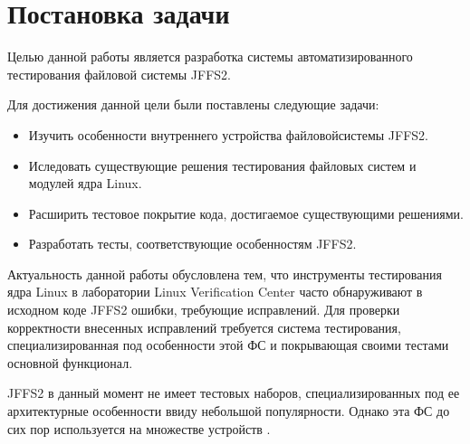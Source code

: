 \section{Постановка задачи}
\label{sec:Chapter1} 

Целью данной работы является разработка системы автоматизированного тестирования файловой системы JFFS2.

Для достижения данной цели были поставлены следующие задачи:

\begin{itemize}
	\item Изучить особенности внутреннего устройства файловойсистемы JFFS2.
	\item Иследовать существующие решения тестирования файловых систем и модулей ядра Linux.
	\item Расширить тестовое покрытие кода, достигаемое существующими решениями.
	\item Разработать тесты, соответствующие особенностям JFFS2.
\end{itemize}

Актуальность данной работы обусловлена тем, что инструменты тестирования ядра Linux в лаборатории Linux Verification Center \cite{lvc} часто обнаруживают в исходном коде JFFS2 ошибки, требующие исправлений. Для проверки корректности внесенных исправлений требуется система тестирования, специализированная под особенности этой ФС и покрывающая своими тестами основной функционал.

JFFS2 в данный момент не имеет тестовых наборов, специализированных под ее архитектурные особенности ввиду небольшой популярности. Однако эта ФС до сих пор используется на множестве устройств \cite{embedded}.

\newpage
